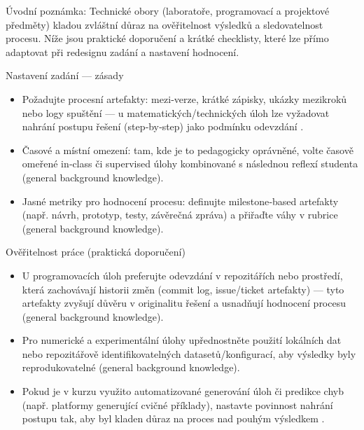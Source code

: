 Úvodní poznámka: Technické obory (laboratoře, programovací a projektové předměty) kladou zvláštní důraz na ověřitelnost výsledků a sledovatelnost procesu. Níže jsou praktické doporučení a krátké checklisty, které lze přímo adaptovat při redesignu zadání a nastavení hodnocení.

Nastavení zadání — zásady
\begin{itemize}
  \item Požadujte procesní artefakty: mezi‑verze, krátké zápisky, ukázky mezikroků nebo logy spuštění — u matematických/technických úloh lze vyžadovat nahrání postupu řešení (step‑by‑step) jako podmínku odevzdání \cite{kb_ai_101_tipu_pdf_04e4a115_page_8_1}.
  \item Časové a místní omezení: tam, kde je to pedagogicky oprávněné, volte časově omeřené in‑class či supervised úlohy kombinované s následnou reflexí studenta (general background knowledge).
  \item Jasné metriky pro hodnocení procesu: definujte milestone‑based artefakty (např. návrh, prototyp, testy, závěrečná zpráva) a přiřaďte váhy v rubrice (general background knowledge).
\end{itemize}

Ověřitelnost práce (praktická doporučení)
\begin{itemize}
  \item U programovacích úloh preferujte odevzdání v repozitářích nebo prostředí, která zachovávají historii změn (commit log, issue/ticket artefakty) — tyto artefakty zvyšují důvěru v originalitu řešení a usnadňují hodnocení procesu (general background knowledge).
  \item Pro numerické a experimentální úlohy upřednostněte použití lokálních dat nebo repozitářově identifikovatelných datasetů/konfigurací, aby výsledky byly reprodukovatelné (general background knowledge).
  \item Pokud je v kurzu využito automatizované generování úloh či predikce chyb (např. platformy generující cvičné příklady), nastavte povinnost nahrání postupu tak, aby byl kladen důraz na proces nad pouhým výsledkem \cite{kb_ai_101_tipu_pdf_04e4a115_page_8_1}.
\end{itemize}

